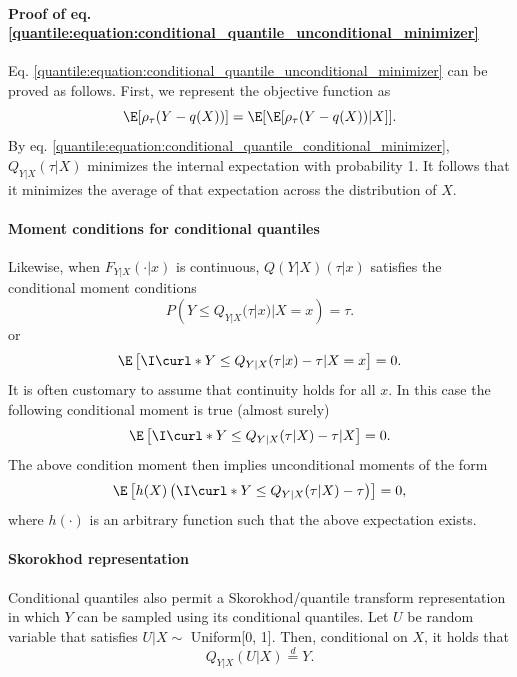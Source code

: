 \paragraph{Proof of eq. \eqref{quantile:equation:conditional_quantile_unconditional_minimizer}}

Eq. \eqref{quantile:equation:conditional_quantile_unconditional_minimizer} can be proved as follows. First, we represent the objective function as 
\begin{equation}
	 \E[\rho_{\tau}(Y-q(X))] = \E[\E[\rho_{\tau}(Y-q(X))|X] ].
\end{equation}
By eq. \eqref{quantile:equation:conditional_quantile_conditional_minimizer},  $Q_{Y|X}(\tau|X)$ minimizes the internal expectation with probability 1. It follows that it minimizes the average of that expectation across the distribution of $X$. 

\paragraph{Moment conditions for conditional quantiles}

Likewise, when $F_{Y|X}(\cdot|x)$ is continuous, $Q(Y|X)(\tau|x)$ satisfies the conditional moment conditions
\begin{equation}
	 P\left( Y\leq Q_{Y|X}(\tau|x)|X=x \right) = \tau.
\end{equation} 
or 
\begin{equation}
	\E\left[\I\curl*{Y\leq  Q_{Y|X}(\tau|x)} -\tau|X= x \right] = 0.
\end{equation}
It is often customary to assume that continuity holds for all $x$. In this case the following conditional moment is true (almost surely)
\begin{equation}
	 	\E\left[\I\curl*{Y\leq  Q_{Y|X}(\tau|X)} - \tau|X\right] = 0.
\end{equation} 
The above condition moment then implies unconditional moments of the form
\begin{equation}
	 \E\left[ h(X) \left(\I\curl*{Y\leq  Q_{Y|X}(\tau|X)} - \tau \right) \right] =0,
\end{equation}
where $h(\cdot)$ is an arbitrary function such that the above expectation exists. 
 
  \paragraph{Skorokhod representation}
  
  Conditional quantiles also permit a Skorokhod/quantile transform representation in which $Y$ can be sampled using its conditional quantiles. Let $U$ be random variable that satisfies $U|X\sim$ Uniform[0, 1].  Then, conditional on $X$, it holds that 
  \begin{equation}\label{quantile:equation:skorokhod_conditional}
  	Q_{Y|X}(U|X) \overset{d}{=} Y.
  \end{equation}
  

